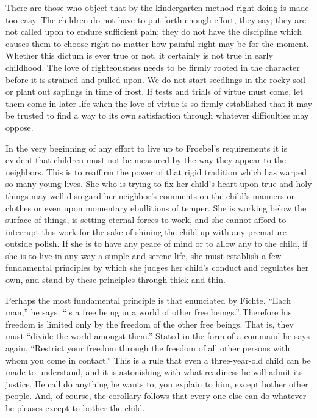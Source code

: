 \begin{linenumbers*}
\indent There are those who object that by the kindergarten method right doing is made too easy. The children do not have to put forth enough effort, they say; they are not called upon to endure sufficient pain; they do not have the discipline which causes them to choose right no matter how painful right may be for the moment. Whether this dictum is ever true or not, it certainly is not true in early childhood. The love of righteousness needs to be firmly rooted in the character before it is strained and pulled upon. We do not start seedlings in the rocky soil or plant out saplings in time of frost. If tests and trials of virtue must come, let them come in later life when the love of virtue is so firmly established that it may be trusted to find a way to its own satisfaction through whatever difficulties may oppose.

\indent In the very beginning of any effort to live up to Froebel's requirements it is evident that children must not be measured by the way they appear to the neighbors. This is to reaffirm the power of that rigid tradition which has warped so many young lives. She who is trying to fix her child's heart upon true and holy things may well disregard her neighbor's comments on the child's manners or clothes or even upon momentary ebullitions of temper. She is working below the surface of things, is setting eternal forces to work, and she cannot afford to interrupt this work for the sake of shining the child up with any premature outside polish. If she is to have any peace of mind or to allow any to the child, if she is to live in any way a simple and serene life, she must establish a few fundamental principles by which she judges her child's conduct and regulates her own, and stand by these principles through thick and thin.

\indent Perhaps the most fundamental principle is that enunciated by Fichte. ``Each man,'' he says, ``is a free being in a world of other free beings.'' Therefore his freedom is limited only by the freedom of the other free beings. That is, they must ``divide the world amongst them.'' Stated in the form of a command he says again, ``Restrict your freedom through the freedom of all other persons with whom you come in contact.'' This is a rule that even a three-year-old child can be made to understand, and it is astonishing with what readiness he will admit its justice. He call do anything he wants to, you explain to him, except bother other people. And, of course, the corollary follows that every one else can do whatever he pleases except to bother the child.
\end{linenumbers*}

